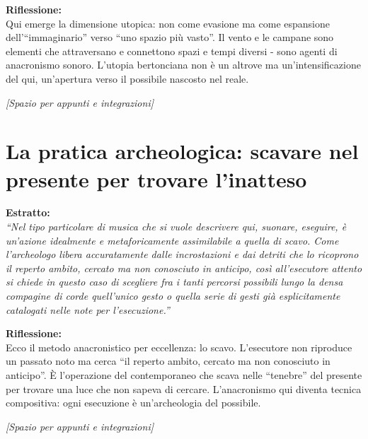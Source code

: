 \documentclass[12pt,a4paper]{article}
\begin{document}
\begin{riflessione}
\textbf{Riflessione:} \\
Qui emerge la dimensione utopica: non come evasione ma come espansione dell'``immaginario'' verso ``uno spazio più vasto''. Il vento e le campane sono elementi che attraversano e connettono spazi e tempi diversi - sono agenti di anacronismo sonoro. L'utopia bertonciana non è un altrove ma un'intensificazione del qui, un'apertura verso il possibile nascosto nel reale.

\vspace{0.5cm}
\textit{[Spazio per appunti e integrazioni]}
\vspace{1cm}
\end{riflessione}

\section{La pratica archeologica: scavare nel presente per trovare l'inatteso}

\begin{estratto}
\textbf{Estratto:} \\
\textit{``Nel tipo particolare di musica che si vuole descrivere qui, suonare, eseguire, è un'azione idealmente e metaforicamente assimilabile a quella di scavo. Come l'archeologo libera accuratamente dalle incrostazioni e dai detriti che lo ricoprono il reperto ambito, cercato ma non conosciuto in anticipo, così all'esecutore attento si chiede in questo caso di scegliere fra i tanti percorsi possibili lungo la densa compagine di corde quell'unico gesto o quella serie di gesti già esplicitamente catalogati nelle note per l'esecuzione.''}
\end{estratto}

\begin{riflessione}
\textbf{Riflessione:} \\
Ecco il metodo anacronistico per eccellenza: lo scavo. L'esecutore non riproduce un passato noto ma cerca ``il reperto ambito, cercato ma non conosciuto in anticipo''. È l'operazione del contemporaneo che scava nelle ``tenebre'' del presente per trovare una luce che non sapeva di cercare. L'anacronismo qui diventa tecnica compositiva: ogni esecuzione è un'archeologia del possibile.

\vspace{0.5cm}
\textit{[Spazio per appunti e integrazioni]}
\vspace{1cm}
\end{riflessione}
\end{document}

